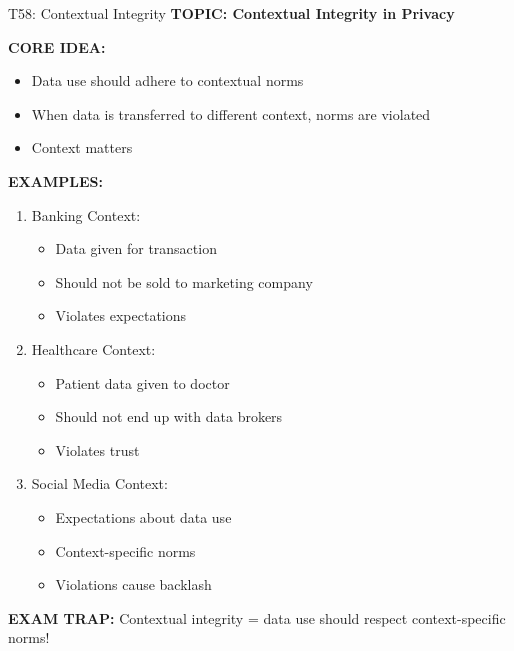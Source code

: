 \documentclass[8pt]{beamer}
\begin{document}
	\begin{frame}{T58: Contextual Integrity}
		\fontsize{6.5}{7.5}\selectfont
		\textbf{TOPIC: Contextual Integrity in Privacy}
		
		\vspace{0.1cm}
		\textbf{CORE IDEA:}
		\begin{itemize}
			\item Data use should adhere to contextual norms
			\item When data is transferred to different context, norms are violated
			\item Context matters
		\end{itemize}
		
		\vspace{0.1cm}
		\textbf{EXAMPLES:}
		\begin{enumerate}
			\item \textcolor{myblue}{Banking Context:}
			\begin{itemize}
				\item Data given for transaction
				\item Should not be sold to marketing company
				\item Violates expectations
			\end{itemize}
			\item \textcolor{myblue}{Healthcare Context:}
			\begin{itemize}
				\item Patient data given to doctor
				\item Should not end up with data brokers
				\item Violates trust
			\end{itemize}
			\item \textcolor{myblue}{Social Media Context:}
			\begin{itemize}
				\item Expectations about data use
				\item Context-specific norms
				\item Violations cause backlash
			\end{itemize}
		\end{enumerate}
		
		\textcolor{myred}{\textbf{EXAM TRAP:}} Contextual integrity = \textcolor{myblue}{data use should respect context-specific norms}!
	\end{frame}
	
\end{document}

